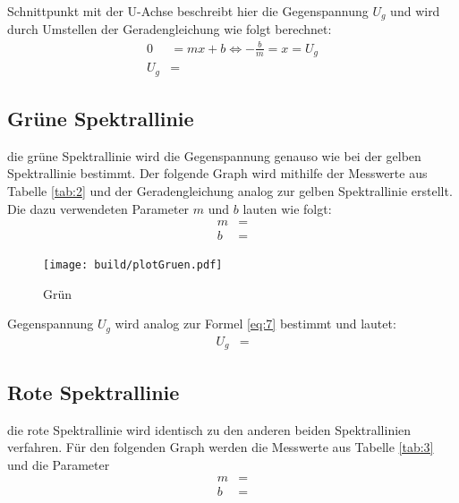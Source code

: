     \justifying Schnittpunkt mit der U-Achse beschreibt hier die Gegenspannung $U_g$ und wird durch Umstellen der Geradengleichung wie folgt berechnet:
    \begin{align}
    0 &= mx+b \Leftrightarrow -\frac{b}{m}=x = U_g \label{eq:7}\\
    U_g &= \text{} \label{eq:8}
    \end{align}

\subsection{Grüne Spektrallinie}

    \justifying die grüne Spektrallinie wird die Gegenspannung genauso wie bei der gelben Spektrallinie bestimmt. Der folgende Graph wird mithilfe der 
    Messwerte aus Tabelle \ref{tab:2} und der Geradengleichung analog zur gelben Spektrallinie erstellt. Die dazu verwendeten Parameter $m$ und $b$ lauten wie folgt:
    \begin{align}
    m &= \text{} \label{eq:9}\\
    b &= \text{} \label{eq:10}
    \end{align}

    \begin{figure}[H]
        \centering
        \texttt{[image: build/plotGruen.pdf]}
        \caption{Grün}
        \label{fig:8}
    \end{figure}

    \justifying Gegenspannung $U_g$ wird analog zur Formel \eqref{eq:7} bestimmt und lautet:
    \begin{align}
    U_g &=\text{} \label{eq:11}
    \end{align}

\subsection{Rote Spektrallinie}

    \justifying die rote Spektrallinie wird identisch zu den anderen beiden Spektrallinien verfahren. Für den folgenden Graph werden die Messwerte aus Tabelle
    \ref{tab:3} und die Parameter
    \begin{align}
    m &= \text{} \label{eq:12}\\
    b &= \text{} \label{eq:13}
    \end{align}
    \justifying

